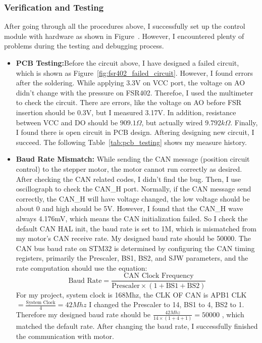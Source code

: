 \subsubsection{Verification and Testing}
After going through all the procedures above, I successfully set up the control module with hardware as shown in Figure~. However, I encountered plenty of problems during the testing and debugging process.
\begin{itemize}
    \item \textbf{PCB Testing:}Before the circuit above, I have designed a failed circuit, which is shown as Figure~\ref{fig:fsr402_failed_circuit}. However, I found errors after the soldering. While applying 3.3V on VCC port, the voltage on AO didn't change with the pressure on FSR402. Therefoe, I used the multimeter to check the circuit. There are errors, like the voltage on AO before FSR insertion should be 0.3V, but I measured 3.17V. In addition, resistance between VCC and DO should be $909.1\Omega$, but actually wired $9.792k\Omega$. Finally, I found there is open circuit in PCB design. Aftering designing new circuit, I succeed. The following Table~\ref{tab:pcb_testing} shows my measure history.
    \item \textbf{Baud Rate Mismatch:} While sending the CAN message (position circuit control) to the stepper motor, the motor cannot run correctly as desired. After checking the CAN related codes, I didn't find the bug. Then, I use oscillograph to check the CAN\_H port. Normally, if the CAN message send correctly, the CAN\_H will have voltage changed, the low voltage should be about 0 and high should be 5V. However, I found that the CAN\_H wave always 4.176mV, which means the CAN initialization failed. So I check the default CAN HAL init, the baud rate is set to 1M, which is mismatched from my motor's CAN receive rate. My designed baud rate should be 50000. The CAN bus baud rate on STM32 is determined by configuring the CAN timing registers, primarily the Prescaler, BS1, BS2, and SJW parameters, and the rate computation should use the equation:
    \begin{equation}
        \text{Baud Rate} = \frac{\text{CAN Clock Frequency}}{\text{Prescaler} \times (1+\text{BS1} + \text{BS2})}
    \end{equation}
    For my project, system clock is 168Mhz, the CLK OF CAN is APB1 CLK  $=\frac{\text{System Clock}}{4}=42Mhz$ I changed the Prescaler to 14, BS1 to 4, BS2 to 1. Therefore my designed baud rate should be  $\frac{42Mhz}{\text{14} \times (1+4+1)}=50000$ , which matched the default rate. After changing the baud rate, I successfully finished the communication with motor.

\end{itemize}
